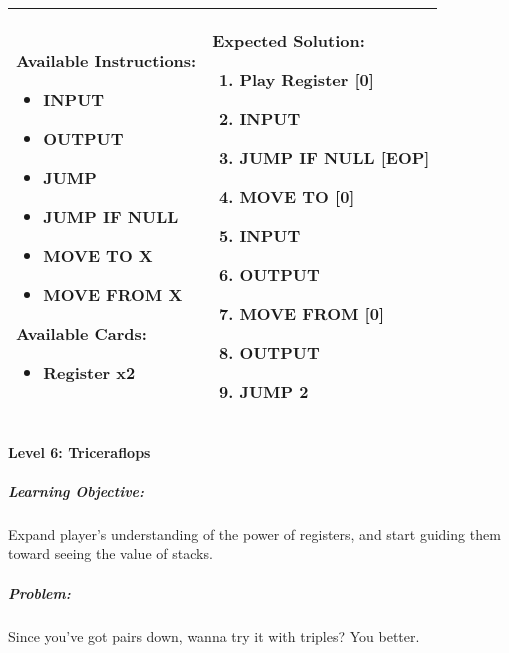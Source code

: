 \begin{center}
    \begin{tabular}{ | m{5cm} | m{9cm} | } 
        \hline
            \textbf{Available Instructions:} 
            \begin{itemize}
                \setlength\itemsep{-.35em}
                \item INPUT
                \item OUTPUT
                \item JUMP
                \item JUMP IF NULL
                \item MOVE TO X
                \item MOVE FROM X
            \end{itemize}
            \textbf{Available Cards:} 
            \begin{itemize}
                \setlength\itemsep{-.35em}
                \item Register x2
            \end{itemize}& 
            \textbf{Expected Solution:} 
            \begin{enumerate}
                \setlength\itemsep{-.35em}
                \item Play Register [0]
                \item INPUT
                \item JUMP IF NULL [EOP]
                \item MOVE TO [0]
                \item INPUT
                \item OUTPUT
                \item MOVE FROM [0] 
                \item OUTPUT
                \item JUMP 2
            \end{enumerate}
            \\
        \hline
    \end{tabular}
\end{center}


\paragraph{Level 6: Triceraflops}
\subparagraph{Learning Objective:} Expand player's understanding of the power of registers, and start guiding them toward seeing the value of stacks.

\subparagraph{Problem:} Since you've got pairs down, wanna try it with triples? You better.

